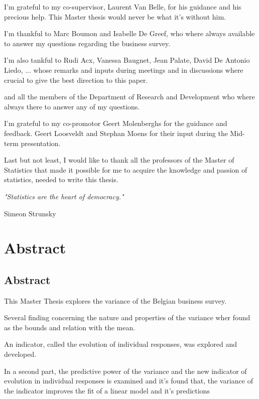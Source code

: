 \documentclass[12pt,a4paper,oneside]{book}
\newenvironment{bottompar}{\par\vspace*{\fill}}{\clearpage}
\begin{document}
I'm grateful to my co-supervisor, Laurent Van Belle, for his guidance and his precious help. This Master thesis would never be what it's without him.

I'm thankful to Marc Boumon and Isabelle De Greef, who where always available to answer my questions regarding the business survey.

I'm also tankful to Rudi Acx, Vanessa Baugnet, Jean Palate, David De Antonio Liedo, ...
 whose remarks and inputs during meetings and in discussions where crucial to give the best direction to this paper.

and all the members of the Department of Research and Development who where always there to answer any of my questions.



I'm grateful to my co-promotor Geert Molenberghs for the guidance and feedback. Geert Loosveldt and Stephan Moens for their input during the Mid-term presentation.

Last but not least, I would like to thank all the professors of the Master of Statistics that made it possible for me to acquire the knowledge and passion of statistics, needed to write this thesis.


\begin{bottompar}
\textit{"Statistics are the heart of democracy." }

    Simeon Strunsky
\end{bottompar}


\chapter*{Abstract}


\section*{Abstract}

This Master Thesis explores the variance of the Belgian business survey.
 
Several finding concerning the nature and properties of the variance wher found as the bounds and relation with the mean.

An indicator, called the evolution of individual responses, was explored and developed.

In a second part, the predictive power of the variance and the new indicator of evolution in individual responses is examined and it's found that, the variance of the indicator improves the fit of a linear model and it's predictions
\end{document}
